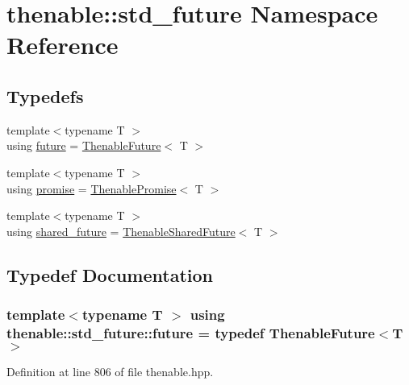 \hypertarget{namespacethenable_1_1std__future}{}\section{thenable\+:\+:std\+\_\+future Namespace Reference}
\label{namespacethenable_1_1std__future}
\subsection*{Typedefs}
\begin{DoxyCompactItemize}
\item 
{\footnotesize template$<$typename T $>$ }\\using \hyperlink{namespacethenable_1_1std__future_a842fb2760d94a1a044f24cd90708c226}{future} = \hyperlink{classthenable_1_1_thenable_future}{Thenable\+Future}$<$ T $>$
\item 
{\footnotesize template$<$typename T $>$ }\\using \hyperlink{namespacethenable_1_1std__future_a588bcec180d4eb0eec47a9a9f1dd2feb}{promise} = \hyperlink{classthenable_1_1_thenable_promise}{Thenable\+Promise}$<$ T $>$
\item 
{\footnotesize template$<$typename T $>$ }\\using \hyperlink{namespacethenable_1_1std__future_ab2ceaa9adac08c6395df3a258b5df5c5}{shared\+\_\+future} = \hyperlink{classthenable_1_1_thenable_shared_future}{Thenable\+Shared\+Future}$<$ T $>$
\end{DoxyCompactItemize}


\subsection{Typedef Documentation}
\subsubsection[{\texorpdfstring{future}{future}}]{\setlength{\rightskip}{0pt plus 5cm}template$<$typename T $>$ using {\bf thenable\+::std\+\_\+future\+::future} = typedef {\bf Thenable\+Future}$<$T$>$}\hypertarget{namespacethenable_1_1std__future_a842fb2760d94a1a044f24cd90708c226}{}\label{namespacethenable_1_1std__future_a842fb2760d94a1a044f24cd90708c226}


Definition at line 806 of file thenable.\+hpp.

